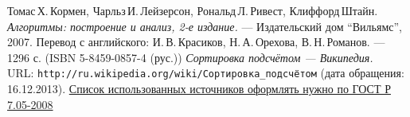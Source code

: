 \begin{thebibliography}{99}
Томас\,Х.\,Кормен, Чарльз\,И.\,Лейзерсон, Рональд\,Л.\,Ривест, Клиффорд\,Штайн.
{\itshape Алгоритмы: построение и анализ, 2-е издание.} --- Издательский дом \enquote{Вильямс}, 2007. Перевод с английского: И.\,В.\,Красиков, Н.\,А.\,Орехова, В.\,Н.\,Романов. --- 1296 с. (ISBN 5-8459-0857-4 (рус.))
{\itshape Сортировка подсчётом — Википедия.} \\URL: \texttt{http://ru.wikipedia.org/wiki/Сортировка\_подсчётом} (дата обращения: 16.12.2013). 
\href{http://www.ifap.ru/library/gost/7052008.pdf}{Список использованных источников оформлять нужно по  ГОСТ Р 7.05-2008}
\end{thebibliography}
\pagebreak

